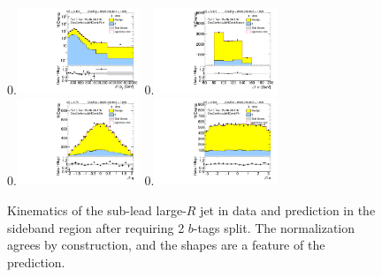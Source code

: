 \begin{figure}[htbp!]
\begin{center}
0.\includegraphics[width=0.33\textwidth, angle=270]{./figures/boosted/Control/Moriond_TwoTag_split_Control_sublHCand_Pt_m_1.pdf}
0.\includegraphics[width=0.33\textwidth, angle=270]{./figures/boosted/Control/Moriond_TwoTag_split_Control_sublHCand_Mass_s.pdf}\\
0.\includegraphics[width=0.33\textwidth, angle=270]{./figures/boosted/Control/Moriond_TwoTag_split_Control_sublHCand_Eta.pdf}
0.\includegraphics[width=0.33\textwidth, angle=270]{./figures/boosted/Control/Moriond_TwoTag_split_Control_sublHCand_Phi.pdf}
  \caption{Kinematics of the sub-lead large-$R$ jet in data and prediction in the sideband region after requiring 2 $b$-tags split. The normalization agrees by construction, and the shapes are a feature of the prediction.}
  \label{fig:boosted-2bs-control-ak10-subl}
\end{center}
\end{figure}


